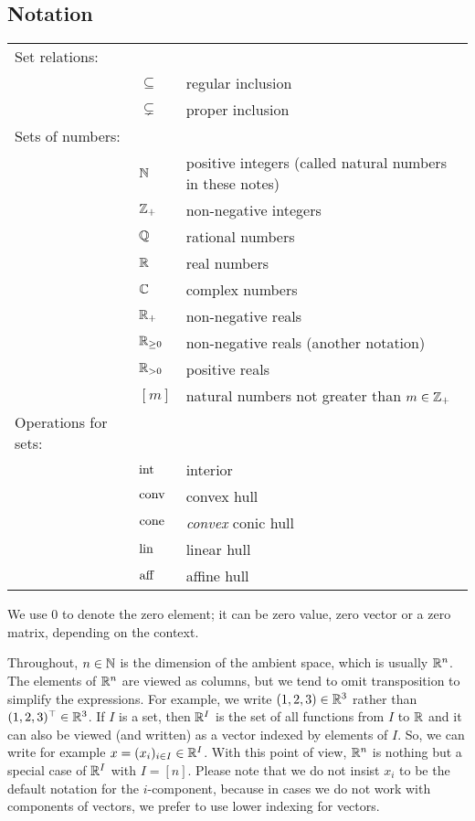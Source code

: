 \subsection{Notation} 

\begin{tabular}{lll}
Set relations:	& & 
\\		& $\subseteq$ & regular inclusion 
\\ 		& $\varsubsetneq$ & proper inclusion
\\ Sets of numbers: & &
\\ & $\mathbb{N}$  & positive integers (called natural numbers in these notes)
\\ & $\mathbb{Z}_+$ & non-negative integers
\\ & $\mathbb{Q}$ & rational numbers
\\ & $\mathbb{R}$ & real numbers
\\ & $\mathbb{C}$ & complex numbers
\\ & $\mathbb{R}_+$ & non-negative reals 
\\ & $\mathbb{R}_{\ge 0}$ & non-negative reals (another notation)
\\ & $\mathbb{R}_{>0}$ & positive reals
\\ & $[m]$ & natural numbers not greater than $m \in \mathbb{Z}_+$
\\ Operations for sets: & & 
\\ & $\operatorname{int}$ & interior
\\ &  $\operatorname{conv}$ & convex hull
\\ &  $\operatorname{cone}$ & \emph{convex} conic hull
\\ & $\operatorname{lin}$ & linear hull
\\ & $\operatorname{aff}$ & affine hull
\end{tabular} 

We use $0$ to denote the zero element; it can be zero value, zero vector or a zero matrix, depending on the context. 

Throughout, $n \in \mathbb{N}$ is the dimension of the ambient space, which is usually $\mathbb{R}^n$. The elements of $\mathbb{R}^n$ are viewed as columns, but we tend to omit transposition to simplify the expressions. For example, we write $(1,2,3) \in \mathbb{R}^3$ rather than $(1,2,3)^\top \in \mathbb{R}^3$. If $I$ is a set, then $\mathbb{R}^I$ is the set of all functions from $I$ to $\mathbb{R}$ and it can also be viewed (and written) as a vector indexed by elements of $I$. So, we can write for example $x=(x_i)_{i \in I} \in \mathbb{R}^I$. With this point of view, $\mathbb{R}^n$ is nothing but a special case of $\mathbb{R}^I$ with $I=[n]$. Please note that we do not insist $x_i$ to be the default notation for the $i$-component, because in cases we do not work with components of vectors, we prefer to use lower indexing for vectors. 


